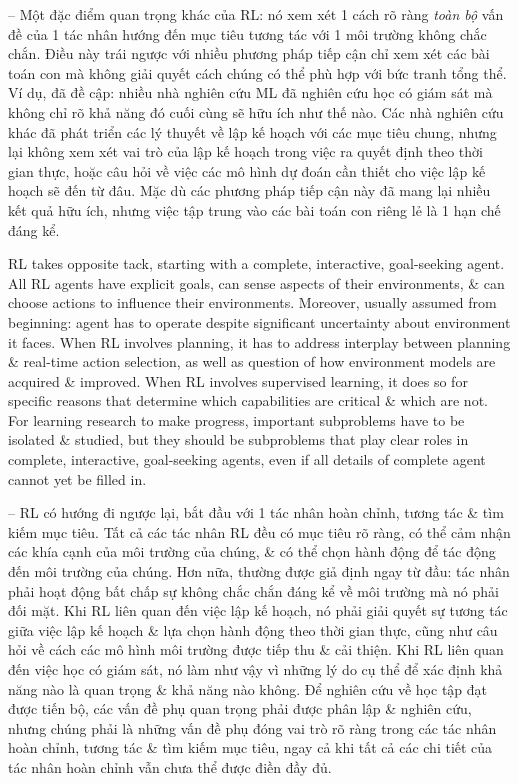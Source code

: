 \documentclass{article}
\begin{document}
\begin{itemize}
\begin{itemize}
        -- Một đặc điểm quan trọng khác của RL: nó xem xét 1 cách rõ ràng {\it toàn bộ} vấn đề của 1 tác nhân hướng đến mục tiêu tương tác với 1 môi trường không chắc chắn. Điều này trái ngược với nhiều phương pháp tiếp cận chỉ xem xét các bài toán con mà không giải quyết cách chúng có thể phù hợp với bức tranh tổng thể. Ví dụ, đã đề cập: nhiều nhà nghiên cứu ML đã nghiên cứu học có giám sát mà không chỉ rõ khả năng đó cuối cùng sẽ hữu ích như thế nào. Các nhà nghiên cứu khác đã phát triển các lý thuyết về lập kế hoạch với các mục tiêu chung, nhưng lại không xem xét vai trò của lập kế hoạch trong việc ra quyết định theo thời gian thực, hoặc câu hỏi về việc các mô hình dự đoán cần thiết cho việc lập kế hoạch sẽ đến từ đâu. Mặc dù các phương pháp tiếp cận này đã mang lại nhiều kết quả hữu ích, nhưng việc tập trung vào các bài toán con riêng lẻ là 1 hạn chế đáng kể.

        RL takes opposite tack, starting with a complete, interactive, goal-seeking agent. All RL agents have explicit goals, can sense aspects of their environments, \& can choose actions to influence their environments. Moreover, usually assumed from beginning: agent has to operate despite significant uncertainty about environment it faces. When RL involves planning, it has to address interplay between planning \& real-time action selection, as well as question of how environment models are acquired \& improved. When RL involves supervised learning, it does so for specific reasons that determine which capabilities are critical \& which are not. For learning research to make progress, important subproblems have to be isolated \& studied, but they should be subproblems that play clear roles in complete, interactive, goal-seeking agents, even if all details of complete agent cannot yet be filled in.

        -- RL có hướng đi ngược lại, bắt đầu với 1 tác nhân hoàn chỉnh, tương tác \& tìm kiếm mục tiêu. Tất cả các tác nhân RL đều có mục tiêu rõ ràng, có thể cảm nhận các khía cạnh của môi trường của chúng, \& có thể chọn hành động để tác động đến môi trường của chúng. Hơn nữa, thường được giả định ngay từ đầu: tác nhân phải hoạt động bất chấp sự không chắc chắn đáng kể về môi trường mà nó phải đối mặt. Khi RL liên quan đến việc lập kế hoạch, nó phải giải quyết sự tương tác giữa việc lập kế hoạch \& lựa chọn hành động theo thời gian thực, cũng như câu hỏi về cách các mô hình môi trường được tiếp thu \& cải thiện. Khi RL liên quan đến việc học có giám sát, nó làm như vậy vì những lý do cụ thể để xác định khả năng nào là quan trọng \& khả năng nào không. Để nghiên cứu về học tập đạt được tiến bộ, các vấn đề phụ quan trọng phải được phân lập \& nghiên cứu, nhưng chúng phải là những vấn đề phụ đóng vai trò rõ ràng trong các tác nhân hoàn chỉnh, tương tác \& tìm kiếm mục tiêu, ngay cả khi tất cả các chi tiết của tác nhân hoàn chỉnh vẫn chưa thể được điền đầy đủ.


\end{itemize}
\end{itemize}
\end{document}
